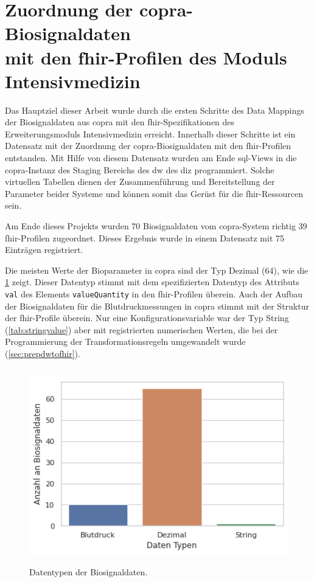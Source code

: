 \section[Zuordnung der \acs{copra}-Biosignaldaten mit den \acs{fhir}-Profilen des Moduls \glqq Intensivmedizin\grqq{}]{Zuordnung der \acs{copra}-Biosignaldaten \\ mit den \acs{fhir}-Profilen des Moduls \glqq Intensivmedizin\grqq{}} \label{sect:resdatamapping}

Das Hauptziel dieser Arbeit wurde durch die ersten Schritte des Data Mappings der Biosignaldaten aus \ac{copra} mit den \ac{fhir}-Spezifikationen des Erweiterungsmoduls \glqq Intensivmedizin\grqq{} erreicht. Innerhalb dieser Schritte ist ein Datensatz mit der Zuordnung der \ac{copra}-Biosignaldaten mit den \ac{fhir}-Profilen entstanden. Mit Hilfe von diesem Datensatz wurden am Ende \ac{sql}-Views in die \ac{copra}-Instanz des Staging Bereichs des \ac{dw} des \ac{diz} programmiert. Solche virtuellen Tabellen dienen der Zusammenführung und Bereitstellung der Parameter beider Systeme und können somit das Gerüst für die \ac{fhir}-Ressourcen sein.

Am Ende dieses Projekts wurden 70 Biosignaldaten vom \ac{copra}-System richtig 39 \ac{fhir}-Profilen zugeordnet. Dieses Ergebnis wurde in einem Datensatz mit 75 Einträgen registriert.

Die meisten Werte der Bioparameter in \ac{copra} sind der Typ Dezimal (64), wie die \ref{fig:signaldatatyps} zeigt. Dieser Datentyp stimmt mit dem spezifizierten Datentyp des Attributs \texttt{val} des Elements \texttt{valueQuantity} in den \ac{fhir}-Profilen überein. Auch der Aufbau der Biosignaldaten für die Blutdruckmessungen in \ac{copra} stimmt mit der Struktur der \ac{fhir}-Profile überein. Nur eine Konfigurationsvariable war der Typ String (\ref{tab:stringvalue}) aber mit registrierten numerischen Werten, die bei der Programmierung der Transformationsregeln umgewandelt wurde (\ref{sec:prepdwtofhir}).

\begin{figure}[ht]
	\centering
	\includegraphics[height=8.5cm]{figures/biosignal_data_types}
	\caption[Datentypen der Biosignaldaten]{Datentypen der Biosignaldaten.}
	\label{fig:signaldatatyps}
\end{figure}

